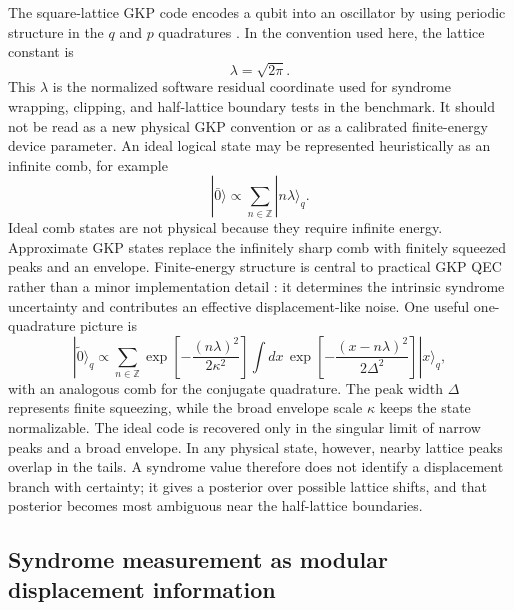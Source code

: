 \documentclass[11pt]{article}
\begin{document}
The square-lattice GKP code encodes a qubit into an oscillator by using
periodic structure in the \(q\) and \(p\) quadratures \cite{gkp2001}.  In the
convention used here, the lattice constant is
\begin{equation}
    \lambda=\sqrt{2\pi}.
\end{equation}
This \(\lambda\) is the normalized software residual coordinate used for
syndrome wrapping, clipping, and half-lattice boundary tests in the benchmark.
It should not be read as a new physical GKP convention or as a calibrated
finite-energy device parameter.
An ideal logical state may be represented heuristically as an infinite comb,
for example
\begin{equation}
    |\bar 0\rangle \propto \sum_{n\in\mathbb{Z}} |n\lambda\rangle_q .
\end{equation}
Ideal comb states are not physical because they require infinite energy.
Approximate GKP states replace the infinitely sharp comb with finitely squeezed
peaks and an envelope.  Finite-energy structure is central to practical GKP
QEC rather than a minor implementation detail \cite{grimsmo2021}: it
determines the intrinsic syndrome uncertainty and contributes an effective
displacement-like noise.
One useful one-quadrature picture is
\begin{equation}
    |\tilde 0\rangle_q
    \propto
    \sum_{n\in\mathbb{Z}}
    \exp\!\left[-\frac{(n\lambda)^2}{2\kappa^2}\right]
    \int dx\,
    \exp\!\left[-\frac{(x-n\lambda)^2}{2\Delta^2}\right]
    |x\rangle_q ,
\end{equation}
with an analogous comb for the conjugate quadrature.  The peak width
\(\Delta\) represents finite squeezing, while the broad envelope scale
\(\kappa\) keeps the state normalizable.  The ideal code is recovered only in
the singular limit of narrow peaks and a broad envelope.  In any physical
state, however, nearby lattice peaks overlap in the tails.  A syndrome value
therefore does not identify a displacement branch with certainty; it gives a
posterior over possible lattice shifts, and that posterior becomes most
ambiguous near the half-lattice boundaries.

\subsection{Syndrome measurement as modular displacement information}
\end{document}
